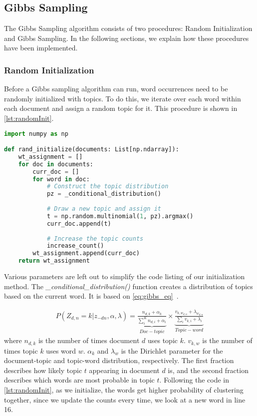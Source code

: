 \subsection{Gibbs Sampling}\label{sec:appendix_gibbs}
The Gibbs Sampling algorithm consists of two procedures: Random Initialization and Gibbs Sampling.
In the following sections, we explain how these procedures have been implemented.

\subsubsection{Random Initialization}
Before a Gibbs sampling algorithm can run, word occurrences need to be randomly initialized with topics.
To do this, we iterate over each word within each document and assign a random topic for it.
This procedure is shown in \autoref{lst:randomInit}.
\begin{lstlisting}[language=Python, caption=Random Initialization,label={lst:randomInit}, float, floatplacement=H]
import numpy as np

def rand_initialize(documents: List[np.ndarray]):
	wt_assignment = []
	for doc in documents:
		curr_doc = []
		for word in doc:
			# Construct the topic distribution
			pz = _conditional_distribution()
			
			# Draw a new topic and assign it
			t = np.random.multinomial(1, pz).argmax()
			curr_doc.append(t)
			
			# Increase the topic counts
			increase_count()
		wt_assignment.append(curr_doc)
	return wt_assignment
\end{lstlisting}

Various parameters are left out to simplify the code listing of our initialization method.
The \emph{\_conditional\_distribution()} function creates a distribution of topics based on the current word.
It is based on \autoref{eq:gibbs_eq}~\cite{author_topic_2012}.

\begin{equation}\label{eq:gibbs_eq}
	\begin{split}
		P(Z_{d,n} = k |z_{-dn}, \alpha, \lambda) = \underbrace{\frac{n_{d,k} + \alpha_{k}}{\sum_{i}^{K} n_{d,i} + \alpha_i}}_{Doc-topic} \times
		\underbrace{\frac{v_{k, w_{d,n}} + \lambda_{w_{d,n}}}{\sum_{i} v_{k,i} + \lambda_i}}_{Topic-word}
	\end{split}
\end{equation}
where $n_{d,k}$ is the number of times document $d$ uses topic $k$.
$v_{k,w}$ is the number of times topic $k$ uses word $w$.
$\alpha_k$ and $\lambda_w$ is the Dirichlet parameter for the document-topic and topic-word distribution, respectively.
The first fraction describes how likely topic $t$ appearing in document $d$ is, and the second fraction describes which words are most probable in topic $t$.
Following the code in \autoref{lst:randomInit}, as we initialize, the words get higher probability of clustering together, since we update the counts every time, we look at a new word in line 16.

